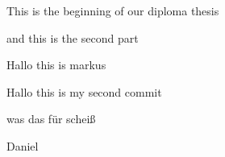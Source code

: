 \documentclass[11pt]{scrartcl}
\begin{document}
 
    This is the beginning of our diploma thesis

    and this is the second part
    
    Hallo this is markus

    Hallo this is my second commit


    was das für scheiß

    Daniel 
\end{document}
